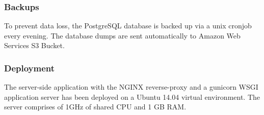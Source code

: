 \subsubsection{Backups}
To prevent data loss, the PostgreSQL database is backed up via a unix cronjob every evening. The database dumps are sent automatically to Amazon Web Services S3 Bucket.
\subsubsection{Deployment}
The server-side application with the NGINX reverse-proxy and a gunicorn WSGI application server has been deployed on a Ubuntu 14.04 virtual environment. The server comprises of 1GHz of shared CPU and 1 GB RAM.